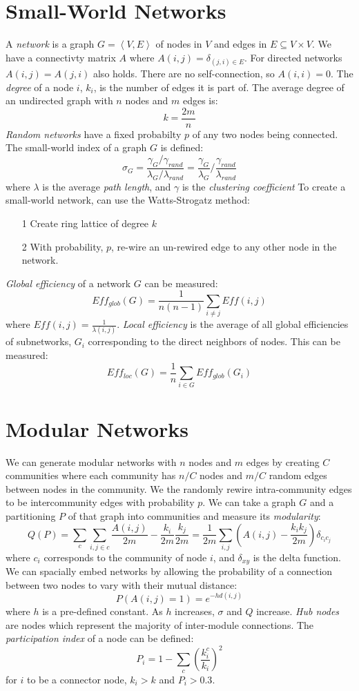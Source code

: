 \documentclass[a4paper,10pt]{article}
\begin{document}
\section{Small-World Networks}
A \emph{network} is a graph $G = \left<V, E\right>$ of nodes in $V$ and edges in $E \subseteq V\times V$.  We have a connectivty matrix $A$ where $A(i,j) = \delta_{(j,i)\in E}$.  For directed networks $A(i,j) = A(j,i)$ also holds.  There are no self-connection, so $A(i,i) = 0$.  The \emph{degree} of a node $i$, $k_i$, is the number of edges it is part of.  The average degree of an undirected graph with $n$ nodes and $m$ edges is:
$$
k = \frac{2m}{n}
$$
\emph{Random networks} have a fixed probabilty $p$ of any two nodes being connected. The small-world index of a graph $G$ is defined:
$$
\sigma_G = \frac{\gamma_G / \gamma_{rand}}{\lambda_G / \lambda_{rand}} = \frac{\gamma_G}{\lambda_G} \Big/ \frac{\gamma_{rand}}{\lambda_{rand}}
$$
where $\lambda$ is the average \emph{path length}, and $\gamma$ is the \emph{clustering coefficient}
To create a small-world network, can use the Watts-Strogatz method:
\begin{itemize}
\item[1] Create ring lattice of degree $k$
\item[2] With probability, $p$, re-wire an un-rewired edge to any other node in the network.
\end{itemize}
\emph{Global efficiency} of a network $G$ can be measured:
$$
Eff_{glob} (G) = \frac{1}{n(n-1)}\sum_{i\neq j} Eff(i, j)
$$
where $Eff(i,j) = \frac{1}{\lambda(i,j)}$. \emph{Local efficiency} is the average of all global efficiencies of subnetworks, $G_i$ corresponding to the direct neighbors of nodes.  This can be measured:
$$
Eff_{loc}(G) = \frac{1}{n}\sum_{i\in G} Eff_{glob}(G_i)
$$

\section{Modular Networks}
We can generate modular networks with $n$ nodes and $m$ edges by creating $C$ communities where each community has $n/C$ nodes and $m/C$ random edges between nodes in the community.  We the randomly rewire intra-community edges to be intercommunity edges with probability $p$.  We can take a graph $G$ and a partitioning $P$ of that graph into communities and measure its \emph{modularity}:
$$
Q(P) = \sum_c \sum_{i,j\in c} \frac{A(i,j)}{2m} - \frac{k_i}{2m}\frac{k_j}{2m} = \frac{1}{2m}\sum_{i,j}\left(A(i,j) - \frac{k_ik_j}{2m}\right)\delta_{c_ic_j}
$$
where $c_i$ corresponds to the community of node $i$, and $\delta_{xy}$ is the delta function.  We can spacially embed networks by allowing the probability of a connection between two nodes to vary with their mutual distance:
$$
P(A(i,j) = 1) = e^{-h d(i,j)}
$$
where $h$ is a pre-defined constant.  As $h$ increases, $\sigma$ and $Q$ increase.  \emph{Hub nodes} are nodes which represent the majority of inter-module connections.  The \emph{participation index} of a node can be defined:
$$
P_i = 1 - \sum_c \left(\frac{k_i^c}{k_i}\right)^2
$$
for $i$ to be a connector node, $k_i > k$ and $P_i > 0.3$.
\end{document}
